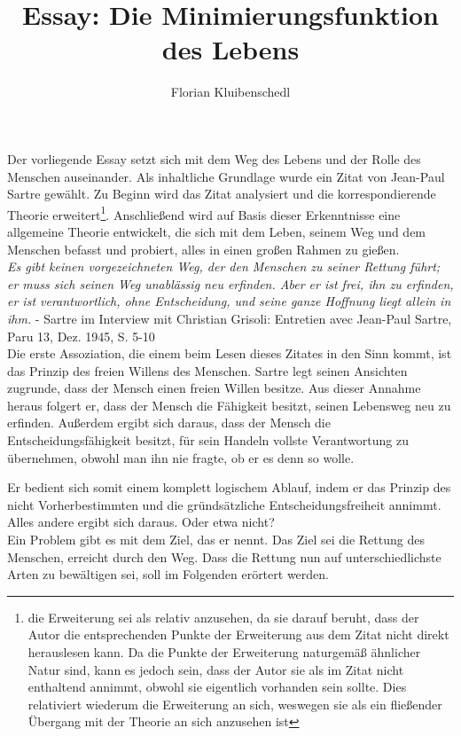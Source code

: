 \documentclass[12pt,a4paper,oneside]{article}
\author{Florian Kluibenschedl}
\title{Essay: Die Minimierungsfunktion des Lebens}
\begin{document}
  \maketitle
  
  Der vorliegende Essay setzt sich mit dem Weg des Lebens und der Rolle des Menschen auseinander. Als inhaltliche Grundlage wurde ein Zitat von Jean-Paul Sartre gewählt. Zu Beginn wird das Zitat analysiert und die korrespondierende Theorie erweitert\footnote{die Erweiterung sei als relativ anzusehen, da sie darauf beruht, dass der Autor die entsprechenden Punkte der Erweiterung aus dem Zitat nicht direkt herauslesen kann. Da die Punkte der Erweiterung naturgemäß ähnlicher Natur sind, kann es jedoch sein, dass der Autor sie als im Zitat nicht enthaltend annimmt, obwohl sie eigentlich vorhanden sein sollte. Dies relativiert wiederum die Erweiterung an sich, weswegen sie als ein fließender Übergang mit der Theorie an sich anzusehen ist}. Anschließend wird auf Basis dieser Erkenntnisse eine allgemeine Theorie entwickelt, die sich mit dem Leben, seinem Weg und dem Menschen befasst und probiert, alles in einen großen Rahmen zu gießen. \\
  
  \textit{\glqq Es gibt keinen vorgezeichneten Weg, der den Menschen zu seiner Rettung führt; er muss sich seinen Weg unablässig neu erfinden. Aber er ist frei, ihn zu erfinden, er ist verantwortlich, ohne Entscheidung, und seine ganze Hoffnung liegt allein in ihm.\grqq} - Sartre im Interview mit Christian Grisoli: \glqq Entretien avec Jean-Paul Sartre\grqq , Paru 13, Dez. 1945, S. 5-10 \\
  
  Die erste Assoziation, die einem beim Lesen dieses Zitates in den Sinn kommt, ist das Prinzip des freien Willens des Menschen. Sartre legt seinen Ansichten zugrunde, dass der Mensch einen freien Willen besitze. Aus dieser Annahme heraus folgert er, dass der Mensch die Fähigkeit besitzt, seinen Lebensweg neu zu erfinden. Außerdem ergibt sich daraus, dass der Mensch die Entscheidungsfähigkeit besitzt, für sein Handeln vollste Verantwortung zu übernehmen, obwohl man ihn nie fragte, ob er es denn so wolle. 
  
  Er bedient sich somit einem komplett logischem Ablauf, indem er das Prinzip des nicht Vorherbestimmten und die gründsätzliche Entscheidungsfreiheit annimmt. Alles andere ergibt sich daraus. Oder etwa nicht? \\
  
  Ein Problem gibt es mit dem Ziel, das er nennt. Das Ziel sei die Rettung des Menschen, erreicht durch den Weg. Dass die Rettung nun auf unterschiedlichste Arten zu bewältigen sei, soll im Folgenden erörtert werden. \\
  
\end{document}
